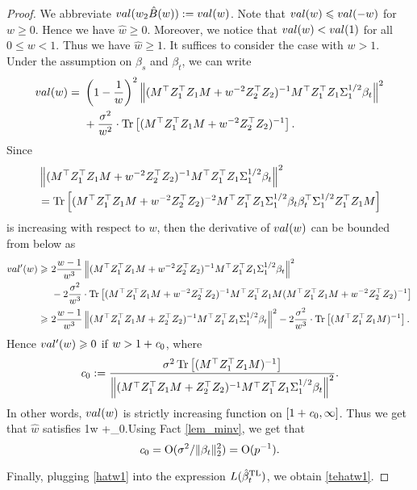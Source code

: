 \begin{proof}
We abbreviate $val(w_2\hat{B}(w)):=val(w)$. Note that $val(w)\leqslant val(-w)$ for $w\ge 0$. Hence we have $\hat w\ge 0$. Moreover, we notice that $val (w) < val (1)$ for all $0\le w < 1$. Thus we have $\hat w\ge 1$. It suffices to consider the case with $w> 1$. Under the assumption on $\beta_s$ and $\beta_t$, we can write
\begin{align}
	val(w) =&~  \left( 1-\frac1w\right)^2 \left\|( M^\top Z_1^{\top}Z_1 M + w^{-2}Z_2^{\top}Z_2)^{-1} M^\top Z_1^{\top} Z_1 \Sigma_1^{1/2}\beta_t \right\|^2 \nonumber \\
			&~ + \frac{\sigma^2}{w^2} \cdot \operatorname{Tr}\left[( M^\top Z_1^{\top}Z_1 M + w^{-2}Z_2^{\top}Z_2)^{-1} \right]. \nonumber
\end{align}
Since
\begin{align*}
&\left\|( M^\top Z_1^{\top}Z_1 M + w^{-2}Z_2^{\top}Z_2)^{-1} M^\top Z_1^{\top} Z_1 \Sigma_1^{1/2}\beta_t \right\|^2 \\
&= \operatorname{Tr} \left[ ( M^\top Z_1^{\top}Z_1 M + w^{-2}Z_2^{\top}Z_2)^{-2}M^\top Z_1^{\top} Z_1 \Sigma_1^{1/2}\beta_t\beta_t^\top \Sigma_1^{1/2}Z_1^{\top} Z_1  M\right]
\end{align*}
is increasing with respect to $w$, then the derivative of $val(w)$ can be bounded from below as
\begin{align*}
val'(w) \geqslant &~ 2\frac{w-1}{w^3} \left\|( M^\top Z_1^{\top}Z_1 M + w^{-2}Z_2^{\top}Z_2)^{-1} M^\top Z_1^{\top} Z_1 \Sigma_1^{1/2}\beta_t \right\|^2   \\
			&~ - 2 \frac{\sigma^2}{w^3} \cdot \operatorname{Tr}\left[(M^\top Z_1^{\top}Z_1 M +w^{-2}  Z_2^{\top}Z_2)^{-1} M^\top Z_1^{\top}Z_1 M (M^\top Z_1^{\top}Z_1 M + w^{-2} Z_2^{\top}Z_2)^{-1}\right] \\
\geqslant &~ 2\frac{w-1}{w^3} \left\|( M^\top Z_1^{\top}Z_1 M +  Z_2^{\top}Z_2)^{-1} M^\top Z_1^{\top} Z_1 \Sigma_1^{1/2}\beta_t \right\|^2   - 2 \frac{\sigma^2}{w^3} \cdot \operatorname{Tr}\left[(M^\top Z_1^{\top}Z_1 M)^{-1}\right].
\end{align*}
Hence $val'(w)\geqslant 0$ if $w>1+ {\mathit{c}}_0$, where
$${\mathit{c}}_0:= \frac{\sigma^2  \operatorname{Tr}\left[(M^\top Z_1^{\top}Z_1 M)^{-1}\right] }{\left\|( M^\top Z_1^{\top}Z_1 M + Z_2^{\top}Z_2)^{-1} M^\top Z_1^{\top} Z_1 \Sigma_1^{1/2}\beta_t \right\|^2}.$$
In other words, $val(w)$ is strictly increasing function on $[1+{\mathit{c}}_0,\infty]$. Thus we get that $\hat w$ satisfies
\be\label{hatw1}1\le w +\e_0.\ee Using Fact \ref{lem_minv}, we get that
$${\mathit{c}}_0=\operatorname{O}(\sigma^2/\|\beta_t\|_2^2)=\operatorname{O}(p^{-1}).$$

Finally, plugging \eqref{hatw1} into the expression $L(\hat{\beta}^{\text{TL}}_{t}) $, we obtain \eqref{tehatw1}.
\end{proof}



